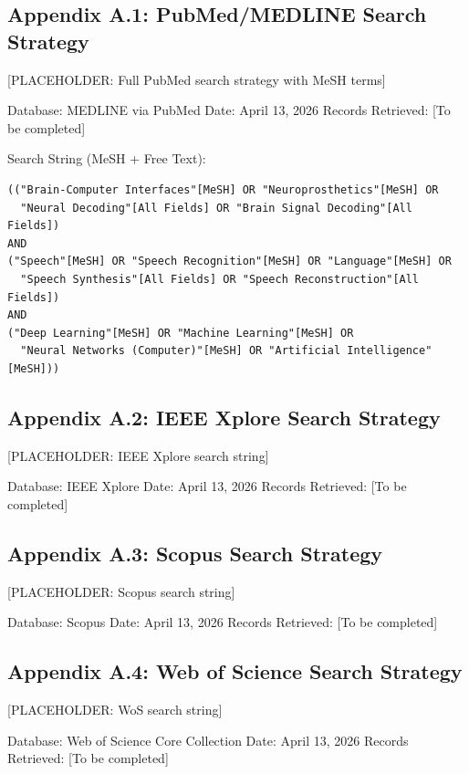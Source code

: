 
\subsection{Appendix A.1: PubMed/MEDLINE Search Strategy}

[PLACEHOLDER: Full PubMed search strategy with MeSH terms]

Database: MEDLINE via PubMed  
Date: April 13, 2026  
Records Retrieved: [To be completed]

Search String (MeSH + Free Text):
\begin{verbatim}
(("Brain-Computer Interfaces"[MeSH] OR "Neuroprosthetics"[MeSH] OR 
  "Neural Decoding"[All Fields] OR "Brain Signal Decoding"[All Fields]) 
AND 
("Speech"[MeSH] OR "Speech Recognition"[MeSH] OR "Language"[MeSH] OR 
  "Speech Synthesis"[All Fields] OR "Speech Reconstruction"[All Fields])
AND 
("Deep Learning"[MeSH] OR "Machine Learning"[MeSH] OR 
  "Neural Networks (Computer)"[MeSH] OR "Artificial Intelligence"[MeSH]))
\end{verbatim}

\subsection{Appendix A.2: IEEE Xplore Search Strategy}

[PLACEHOLDER: IEEE Xplore search string]

Database: IEEE Xplore  
Date: April 13, 2026  
Records Retrieved: [To be completed]

\subsection{Appendix A.3: Scopus Search Strategy}

[PLACEHOLDER: Scopus search string]

Database: Scopus  
Date: April 13, 2026  
Records Retrieved: [To be completed]

\subsection{Appendix A.4: Web of Science Search Strategy}

[PLACEHOLDER: WoS search string]

Database: Web of Science Core Collection  
Date: April 13, 2026  
Records Retrieved: [To be completed]

